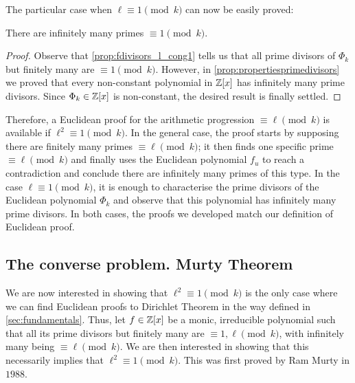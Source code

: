 \documentclass[../main.tex]{subfiles}
\begin{document}
The particular case when $\ell \equiv 1 \pmod{k}$ can now be easily proved:
	\begin{corollary}\label{corol:infinite_cong1}
		There are infinitely many primes $\equiv 1 \pmod{{k}}$.
	\end{corollary}
	\begin{proof}
		Observe that \cref{prop:fdivisors_l_cong1} tells us that all prime divisors of $\Phi_k$ but finitely many are $\equiv 1\pmod{k}$. However, in \cref{prop:propertiesprimedivisors} we proved that every non-constant polynomial in $\mathbb{Z}[x]$ has infinitely many prime divisors. Since $\Phi_k\in\mathbb{Z}[x]$ is non-constant, the desired result is finally settled.
	\end{proof}

 Therefore, a Euclidean proof for the arithmetic progression $\equiv \ell\pmod{k}$ is available if $\ell^2\equiv 1 \pmod{k}$. In the general case, the proof starts by supposing there are finitely many primes $\equiv \ell \pmod{k}$; it then finds one specific prime $\equiv \ell\pmod{k}$ and finally uses the Euclidean polynomial $f_u$ to reach a contradiction and conclude there are infinitely many primes of this type. In the case $\ell\equiv 1\pmod{k}$, it is enough to characterise the prime divisors of the Euclidean polynomial $\Phi_k$ and observe that this polynomial has infinitely many prime divisors. In both cases, the proofs we developed match our definition of Euclidean proof.

\subsection{The converse problem. Murty Theorem}\label{sec:converseMurty}

We are now interested in showing that $\ell^2\equiv 1\pmod{k}$ is the only case where we can find Euclidean proofs to Dirichlet Theorem in the way defined in \cref{sec:fundamentals}. Thus, let $f\in\mathbb{Z}[x]$ be a monic, irreducible polynomial such that all its prime divisors but finitely many are $\equiv 1, \ell \pmod{k}$, with infinitely many being $\equiv\ell\pmod{k}$. We are then interested in showing that this necessarily implies that $\ell^2\equiv 1 \pmod{k}$. This was first proved by Ram Murty in $1988$. 
\end{document}
